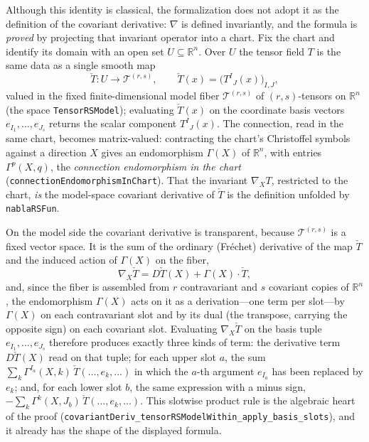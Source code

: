 \documentclass[11pt]{article}
\theoremstyle{plain}
\theoremstyle{definition}
\theoremstyle{remark}
\newcommand{\leanref}[1]{\nolinkurl{#1}}
\begin{document}
Although this identity is classical, the formalization does not adopt it as the
definition of the covariant derivative: $\nabla$ is defined invariantly, and the
formula is \emph{proved} by projecting that invariant operator into a chart.
Fix the chart and identify its domain with an open set $U\subseteq\mathbb R^n$.
Over $U$ the tensor field $T$ is the same data as a single smooth map
\[
  \check T : U \longrightarrow \mathcal T^{(r,s)},
  \qquad
  \check T(x)=\bigl(T^I{}_J(x)\bigr)_{I,J},
\]
valued in the fixed finite-dimensional model fiber $\mathcal T^{(r,s)}$ of
$(r,s)$-tensors on $\mathbb R^n$ (the space \leanref{TensorRSModel}); evaluating
$\check T(x)$ on the coordinate basis vectors $e_{I_1},\dots,e_{J_s}$ returns the
scalar component $T^I{}_J(x)$.  The connection, read in the same chart, becomes
matrix-valued: contracting the chart's Christoffel symbols against a direction
$X$ gives an endomorphism $\Gamma(X)$ of $\mathbb R^n$, with entries
$\Gamma^p(X,q)$, the \emph{connection endomorphism in the chart}
(\leanref{connectionEndomorphismInChart}).  That the invariant $\nabla_X T$,
restricted to the chart, \emph{is} the model-space covariant derivative of
$\check T$ is the definition unfolded by \leanref{nablaRSFun}.

On the model side the covariant derivative is transparent, because
$\mathcal T^{(r,s)}$ is a fixed vector space.  It is the sum of the ordinary
(Fr\'echet) derivative of the map $\check T$ and the induced action of
$\Gamma(X)$ on the fiber,
\[
  \nabla_X\check T = D\check T(X) + \Gamma(X)\cdot\check T ,
\]
and, since the fiber is assembled from $r$ contravariant and $s$ covariant
copies of $\mathbb R^n$, the endomorphism $\Gamma(X)$ acts on it as a
derivation---one term per slot---by $\Gamma(X)$ on each contravariant slot and
by its dual (the transpose, carrying the opposite sign) on each covariant slot.
Evaluating $\nabla_X\check T$ on the basis tuple $e_{I_1},\dots,e_{J_s}$
therefore produces exactly three kinds of term: the derivative term
$D\check T(X)$ read on that tuple; for each upper slot $a$, the sum
$\sum_k\Gamma^{I_a}(X,k)\,\check T(\dots,e_k,\dots)$ in which the $a$-th argument
$e_{I_a}$ has been replaced by $e_k$; and, for each lower slot $b$, the same
expression with a minus sign, $-\sum_k\Gamma^k(X,J_b)\,\check T(\dots,e_k,\dots)$.
This slotwise product rule is the algebraic heart of the proof
(\leanref{covariantDeriv_tensorRSModelWithin_apply_basis_slots}), and it already
has the shape of the displayed formula.
\end{document}
